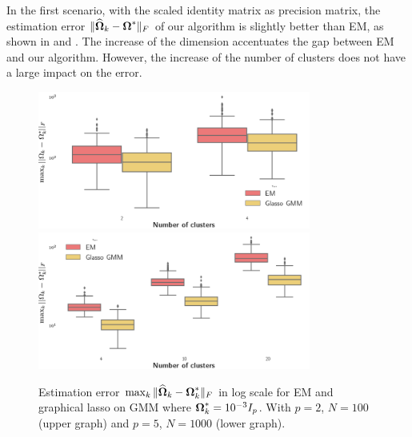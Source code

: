In the first scenario, with the scaled identity matrix as precision matrix, the estimation error $\|\widehat{\boldsymbol\Omega}_k-\boldsymbol\Omega^*\|_F$ of our algorithm is slightly better than EM, as shown in  and . The increase of the dimension accentuates the gap between EM and our algorithm. However, the increase of the number of clusters does not have a large impact on the error.
\begin{figure}
\centering
\includegraphics[width=0.8\textwidth]{TeX_files/graph_lasso_2_100.png} 
\includegraphics[width=0.8\textwidth]{TeX_files/graph_lasso_5_1000.png}
\caption{Estimation error $\max_k\|\widehat{\boldsymbol\Omega}_k-\boldsymbol\Omega_k^*\|_F$ in log scale for EM and graphical lasso on GMM where $\boldsymbol\Omega_k^*=10^{-3}I_p$.  With $p=2$, $N=100$ (upper graph) and $p=5$, $N=1000$ (lower graph).}
\label{fig:glasso_res_simu} 
\end{figure}

